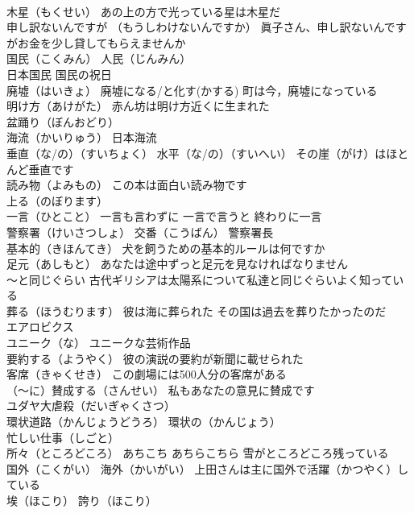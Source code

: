 \documentclass[8pt]{extreport}
\begin{document}
\begin{CJK}{UTF8}{min}
\\	木星（もくせい） あの上の方で光っている星は木星だ
\\	申し訳ないんですが （もうしわけないんですか） 眞子さん、申し訳ないんですがお金を少し貸してもらえませんか
\\	国民（こくみん） 人民（じんみん）
\\	日本国民 国民の祝日
\\	廃墟（はいきょ） 廃墟になる/と化す(かする) 町は今，廃墟になっている
\\	明け方（あけがた） 赤ん坊は明け方近くに生まれた
\\	盆踊り（ぼんおどり）
\\	海流（かいりゅう） 日本海流
\\	垂直（な/の）（すいちょく） 水平（な/の）（すいへい） その崖（がけ）はほとんど垂直です
\\	読み物（よみもの） この本は面白い読み物です
\\	上る（のぼります）
\\	一言（ひとこと） 一言も言わずに 一言で言うと 終わりに一言
\\	警察署（けいさつしょ） 交番（こうばん） 警察署長
\\	基本的（きほんてき） 犬を飼うための基本的ルールは何ですか
\\	足元（あしもと） あなたは途中ずっと足元を見なければなりません
\\	～と同じぐらい 古代ギリシアは太陽系について私達と同じぐらいよく知っている
\\	葬る（ほうむります） 彼は海に葬られた その国は過去を葬りたかったのだ
\\	エアロビクス
\\	ユニーク（な） ユニークな芸術作品
\\	要約する（ようやく） 彼の演説の要約が新聞に載せられた
\\	客席（きゃくせき） この劇場には500人分の客席がある
\\	（～に）賛成する（さんせい） 私もあなたの意見に賛成です
\\	ユダヤ大虐殺（だいぎゃくさつ）
\\	環状道路（かんじょうどうろ） 環状の（かんじょう）
\\	忙しい仕事（しごと）
\\	所々（ところどころ） あちこち あちらこちら 雪がところどころ残っている
\\	国外（こくがい） 海外（かいがい） 上田さんは主に国外で活躍（かつやく）している
\\	埃（ほこり） 誇り（ほこり）

\end{CJK}
\end{document}
